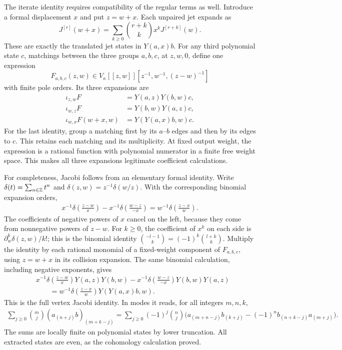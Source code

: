 The iterate identity requires compatibility of the regular terms as
well.  Introduce a formal displacement $x$ and put $z=w+x$.
Each unpaired jet expands as
\[
 J^{[r]}(w+x)=\sum_{k\ge0}\binom{r+k}{k}x^kJ^{[r+k]}(w).
\]
These are exactly the translated jet states in $Y(a,x)b$.
For any third polynomial state $c$, matchings between the three groups
$a,b,c$, at $z,w,0$, define one expression
\[
 F_{a,b,c}(z,w)\in
 V_\kappa[[z,w]][z^{-1},w^{-1},(z-w)^{-1}]
\]
with finite pole orders.  Its three expansions are
\[
 \begin{aligned}
 \iota_{z,w}F&=Y(a,z)Y(b,w)c,\\
 \iota_{w,z}F&=Y(b,w)Y(a,z)c,\\
 \iota_{w,x}F(w+x,w)&=Y(Y(a,x)b,w)c.
 \end{aligned}
\]
For the last identity, group a matching first by its $a$--$b$ edges
and then by its edges to $c$.  This retains each matching and its
multiplicity.  At fixed output weight, the expression is a rational
function with polynomial numerator in a finite free weight space.
This makes all three expansions legitimate coefficient calculations.

For completeness, Jacobi follows from an elementary formal identity.
Write $\delta(t)=\sum_{n\in\mathbb Z}t^n$ and
$\delta(z,w)=z^{-1}\delta(w/z)$.  With the corresponding binomial
expansion orders,
\[
 \begin{split}
 x^{-1}\delta\left(\frac{z-w}{x}\right)
 -x^{-1}\delta\left(\frac{w-z}{-x}\right)
 =w^{-1}\delta\left(\frac{z-x}{w}\right).
 \end{split}
\]
The coefficients of negative powers of $x$ cancel on the left,
because they come from nonnegative powers of $z-w$.  For $k\ge0$,
the coefficient of $x^k$ on each side is
$\partial_w^k\delta(z,w)/k!$; this is the binomial identity
$\binom{-l-1}{k}=(-1)^k\binom{l+k}{k}$.
Multiply the identity by each rational monomial of a fixed-weight
component of $F_{a,b,c}$, using $z=w+x$ in its collision expansion.
The same binomial calculation, including negative exponents, gives
\[
 \begin{split}
 &x^{-1}\delta\left(\frac{z-w}{x}\right)Y(a,z)Y(b,w)
 -x^{-1}\delta\left(\frac{w-z}{-x}\right)Y(b,w)Y(a,z)\\
 &\qquad=w^{-1}\delta\left(\frac{z-x}{w}\right)
                                     Y(Y(a,x)b,w).
 \end{split}
\]
This is the full vertex Jacobi identity.  In modes it reads, for all
integers $m,n,k$,
\[
 \begin{split}
 \sum_{j\ge0}\binom mj(a_{(n+j)}b)_{(m+k-j)}
 =\sum_{j\ge0}(-1)^j\binom nj
 \bigl(a_{(m+n-j)}b_{(k+j)}
       -(-1)^n b_{(n+k-j)}a_{(m+j)}\bigr).
 \end{split}
\]
The sums are locally finite on polynomial states by lower truncation.
All extracted states are even, as the cohomology calculation proved.


